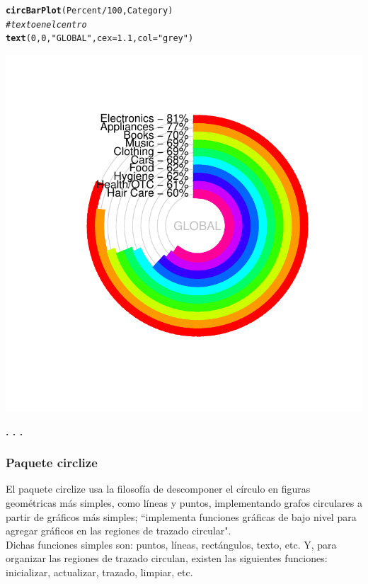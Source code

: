 \documentclass{article}\usepackage[]{graphicx}\usepackage[]{color}
\makeatletter
\def\maxwidth{ %
  \ifdim\Gin@nat@width>\linewidth
    \linewidth
  \else
    \Gin@nat@width
  \fi
}
\newcommand{\hlnum}[1]{\textcolor[rgb]{0.686,0.059,0.569}{#1}}%
\newcommand{\hlstr}[1]{\textcolor[rgb]{0.192,0.494,0.8}{#1}}%
\newcommand{\hlcom}[1]{\textcolor[rgb]{0.678,0.584,0.686}{\textit{#1}}}%
\newcommand{\hlopt}[1]{\textcolor[rgb]{0,0,0}{#1}}%
\newcommand{\hlstd}[1]{\textcolor[rgb]{0.345,0.345,0.345}{#1}}%
\newcommand{\hlkwc}[1]{\textcolor[rgb]{0.333,0.667,0.333}{#1}}%
\newcommand{\hlkwd}[1]{\textcolor[rgb]{0.737,0.353,0.396}{\textbf{#1}}}%
\newenvironment{kframe}{%
 \def\at@end@of@kframe{}%
 \ifinner\ifhmode%
  \def\at@end@of@kframe{\end{minipage}}%
  \begin{minipage}{\columnwidth}%
 \fi\fi%
 \def\FrameCommand##1{\hskip\@totalleftmargin \hskip-\fboxsep
 \colorbox{shadecolor}{##1}\hskip-\fboxsep
     \hskip-\linewidth \hskip-\@totalleftmargin \hskip\columnwidth}%
 \MakeFramed {\advance\hsize-\width
   \@totalleftmargin\z@ \linewidth\hsize
   \@setminipage}}%
 {\par\unskip\endMakeFramed%
 \at@end@of@kframe}
\newenvironment{knitrout}{}{} %
\makeatother
\begin{document}
\begin{knitrout}
\color{fgcolor}\begin{kframe}
\begin{alltt}
\hlkwd{circBarPlot}\hlstd{(Percent}\hlopt{/}\hlnum{100}\hlstd{, Category)}
\hlcom{# texto en el centro}
\hlkwd{text}\hlstd{(}\hlnum{0}\hlstd{,}\hlnum{0}\hlstd{,}\hlstr{"GLOBAL"}\hlstd{,}\hlkwc{cex}\hlstd{=}\hlnum{1.1}\hlstd{,}\hlkwc{col}\hlstd{=}\hlstr{"grey"}\hlstd{)}
\end{alltt}
\end{kframe}

{\centering \includegraphics[width=\maxwidth]{figure/plot_plotrix_cb-1} 

}



\end{knitrout}
\begin{center}
\textbf{. . .}
\end{center}
\subsubsection{Paquete circlize}
El paquete circlize usa la filosof\'ia de descomponer el c\'irculo en figuras geom\'etricas m\'as 
simples, como l\'ineas y puntos, implementando grafos circulares a partir de gr\'aficos m\'as 
simples; ``implementa funciones gr\'aficas de bajo nivel para agregar gr\'aficos en las regiones de 
trazado circular".%
~\\Dichas funciones simples son: puntos, l\'ineas, rect\'angulos, texto, etc. Y, para organizar las 
regiones de trazado circulan, existen las siguientes funciones: inicializar, actualizar, trazado, 
limpiar, etc.~\\
\end{document}
